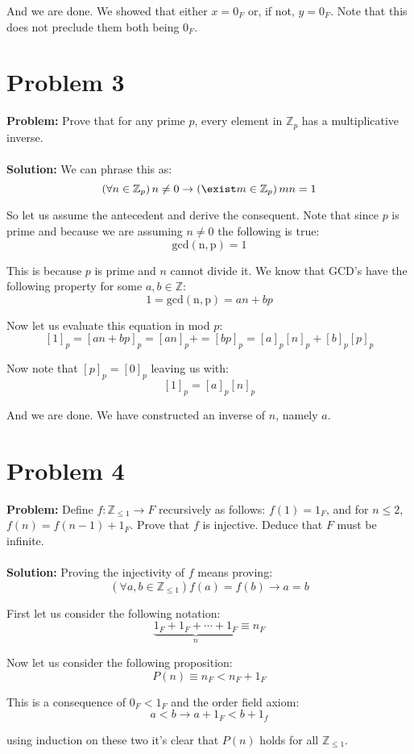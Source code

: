 \documentclass{article}
\begin{document}
And we are done. We showed that either $x=0_F$ or, if not, $y=0_F$. Note that this does not preclude them both being $0_F$.

\section*{Problem 3}
\textbf{Problem:} Prove that for any prime $p$, every element in $\mathbb Z_p$ has a multiplicative inverse.
\\\\
\textbf{Solution:} We can phrase this as:
$$\left(\forall n\in\mathbb Z_p\right) n\not=0\rightarrow \left(\exist m\in\mathbb Z_p\right) mn=1$$

So let us assume the antecedent and derive the consequent. Note that since $p$ is prime and because we are assuming $n\not=0$ the following is true:
$$\operatorname{gcd(n,p)}=1$$

This is because $p$ is prime and $n$ cannot divide it. We know that GCD's have the following property for some $a,b\in\mathbb Z$:
$$1=\operatorname{gcd(n,p)}=an+bp$$

Now let us evaluate this equation in mod $p$:
$$[1]_p=[an+bp]_p=[an]_p+=[bp]_p=[a]_p[n]_p+[b]_p[p]_p$$

Now note that $[p]_p=[0]_p$ leaving us with:
$$[1]_p=[a]_p[n]_p$$

And we are done. We have constructed an inverse of $n$, namely $a$.

\section*{Problem 4}
\textbf{Problem:} Define  $f:\mathbb Z_{\le1}\to F$ recursively as follows:  $f(1)=1_F$, and for $n\le2$, $f(n) = f(n - 1) + 1_F$. Prove that $f$ is injective. Deduce that $F$ must be infinite.
\\\\
\textbf{Solution:} Proving the injectivity of $f$ means proving:
$$\left(\forall a,b\in\mathbb Z_{\le1}\right) f(a)=f(b)\rightarrow a=b$$

First let us consider the following notation:
$$\underbrace{1_F+1_F+\cdots+1_F}_{n}\equiv n_F$$

Now let us consider the following proposition:
$$P(n)\equiv n_F<n_F+1_F$$

This is a consequence of $0_F<1_F$ and the order field axiom:
$$a<b\rightarrow a+1_F<b+1_f$$

using induction on these two it's clear that $P(n)$ holds for all $\mathbb Z_{\le 1}$.
\end{document}
